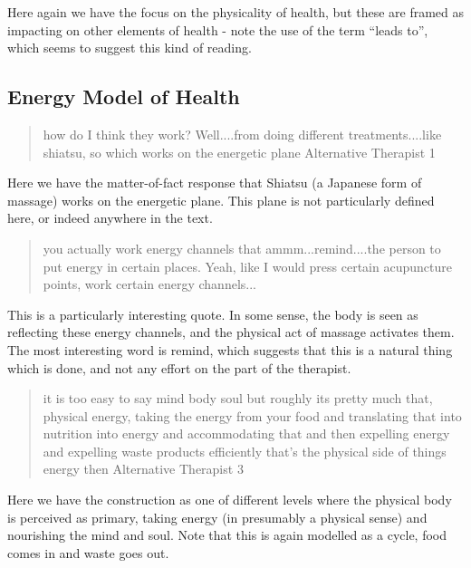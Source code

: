Here again we have the focus on the physicality of health, but these are framed as impacting on other elements of health - note the use of the term ``leads to'', which seems to suggest this kind of reading. 



\subsection{Energy Model of Health}
\label{sec:energy-model-health}

\begin{quotation}
  how do I think they work? Well....from doing different treatments....like shiatsu, so which works on the energetic plane
Alternative Therapist 1
\end{quotation}


Here we have the matter-of-fact response that Shiatsu (a Japanese form of massage) works on the energetic plane. This plane is not particularly defined here, or indeed anywhere in the text. 


\begin{quotation}
   you actually work energy channels that ammm...remind....the person to put energy in certain places. Yeah, like I would press certain acupuncture points, work certain energy channels...

\end{quotation}

This is a particularly interesting quote. In some sense, the body is seen as reflecting these energy channels, and the physical act of massage activates them. The most interesting word is remind, which suggests that this is a natural thing which is done, and not any effort on the part of the therapist. 

\begin{quotation}
  it is too easy to say mind body soul but roughly its pretty much that, physical energy, taking the energy from your food and translating that into nutrition into energy and accommodating that and then expelling energy and expelling waste products efficiently that's the physical side of things energy then 
Alternative Therapist 3
\end{quotation}

Here we have the construction as one of different levels  where the physical body is perceived as primary, taking energy (in presumably a physical sense) and nourishing the mind and soul. Note that this is again modelled as a cycle, food comes in and waste goes out. 

